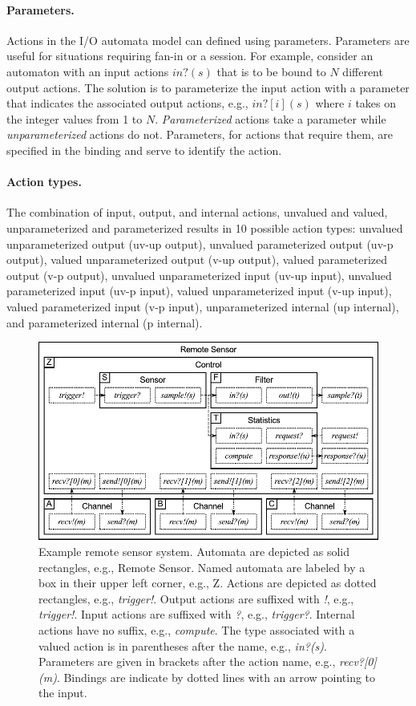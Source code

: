 \paragraph{Parameters.}
Actions in the I/O automata model can defined using parameters.
Parameters are useful for situations requiring fan-in or a session.
For example, consider an automaton with an input actions $in?(s)$ that is to be bound to $N$ different output actions.
The solution is to parameterize the input action with a parameter that indicates the associated output actions, e.g., $in?[i](s)$ where $i$ takes on the integer values from 1 to $N$.
\emph{Parameterized} actions take a parameter while \emph{unparameterized} actions do not.
Parameters, for actions that require them, are specified in the binding and serve to identify the action.

\paragraph{Action types.}
The combination of input, output, and internal actions, unvalued and valued, unparameterized and parameterized results in 10 possible action types:
unvalued unparameterized output (uv-up output),
unvalued parameterized output (uv-p output),
valued unparameterized output (v-up output),
valued parameterized output (v-p output),
unvalued unparameterized input (uv-up input),
unvalued parameterized input (uv-p input),
valued unparameterized input (v-up input),
valued parameterized input (v-p input),
unparameterized internal (up internal), and
parameterized internal (p internal).

\begin{figure}
\center
\includegraphics[width=\textwidth]{example1}
\caption{Example remote sensor system.
  Automata are depicted as solid rectangles, e.g., Remote Sensor.
  Named automata are labeled by a box in their upper left corner, e.g., Z.
  Actions are depicted as dotted rectangles, e.g., \emph{trigger!}.
  Output actions are suffixed with \emph{!}, e.g., \emph{trigger!}.
  Input actions are suffixed with \emph{?}, e.g., \emph{trigger?}.
  Internal actions have no suffix, e.g., \emph{compute}.
  The type associated with a valued action is in parentheses after the name, e.g., \emph{in?(s)}.
  Parameters are given in brackets after the action name, e.g., \emph{recv?[0](m)}.
  Bindings are indicate by dotted lines with an arrow pointing to the input.
}
\label{example1}
\end{figure}

